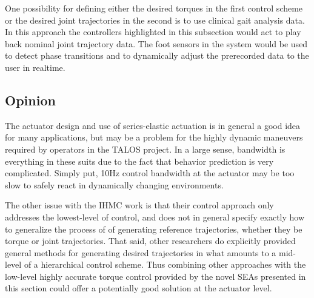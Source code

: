  One possibility for defining either the desired torques in the first control scheme or the desired joint trajectories in the second is to use clinical gait analysis data.  In this approach the controllers highlighted in this subsection would act to play back nominal joint trajectory data.  The foot sensors in the system would be used to detect phase transitions and to dynamically adjust the prerecorded data to the user in realtime.
 
 
 \subsection{Opinion}
 
 The actuator design and use of series-elastic actuation is in general a good idea for many applications, but may be a problem for the highly dynamic maneuvers required by operators in the TALOS project.  In a large sense, bandwidth is everything in these suits due to the fact that behavior prediction is very complicated.  Simply put, 10Hz control bandwidth at the actuator may be too slow to safely react in dynamically changing environments. 
 
 The other issue with the IHMC work is that their control approach only addresses the lowest-level of control, and does not in general specify exactly how to generalize the process of of generating reference trajectories, whether they be torque or joint trajectories.  That said, other researchers do explicitly provided general methods for generating desired trajectories in what amounts to a mid-level of a hierarchical control scheme.  Thus combining other approaches with the low-level highly accurate torque control provided by the novel SEAs presented in this section could offer a potentially good solution at the actuator level. 
 

% 




